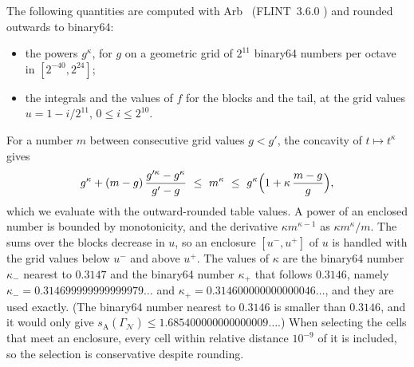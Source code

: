 \documentclass[11pt]{amsart}
\theoremstyle{definition}
\theoremstyle{remark}
\newcommand{\GN}{\Gamma_{\mathcal N}}
\newcommand{\sA}{s_{\mathrm A}}
\begin{document}
The following quantities are computed with Arb~\cite{Arb} (FLINT~3.6.0 \cite{FLINT}) and rounded outwards to binary64:
\begin{itemize}
\item the powers $g^\kappa$, for $g$ on a geometric grid of $2^{11}$ binary64 numbers per octave in $[2^{-40},2^{24}]$;
\item the integrals and the values of $f$ for the blocks and the tail, at the grid values $u=1-i/2^{11}$, $0\le i\le2^{10}$.
\end{itemize}
For a number $m$ between consecutive grid values $g<g'$, the concavity of $t\mapsto t^\kappa$ gives
\[
  g^\kappa+(m-g)\,\frac{g'^\kappa-g^\kappa}{g'-g}\ \le\ m^\kappa\ \le\ g^\kappa\Bigl(1+\kappa\,\frac{m-g}{g}\Bigr),
\]
which we evaluate with the outward-rounded table values. A power of an enclosed number is bounded by monotonicity, and the derivative $\kappa m^{\kappa-1}$ as $\kappa m^\kappa/m$. The sums over the blocks decrease in $u$, so an enclosure $[u^-,u^+]$ of $u$ is handled with the grid values below $u^-$ and above $u^+$. The values of $\kappa$ are the binary64 number $\kappa_-$ nearest to $0.3147$ and the binary64 number $\kappa_+$ that follows $0.3146$, namely $\kappa_-=0.314699999999999979\ldots$ and $\kappa_+=0.314600000000000046\ldots$, and they are used exactly. (The binary64 number nearest to $0.3146$ is smaller than $0.3146$, and it would only give $\sA(\GN)\le1.685400000000000009\ldots$.) When selecting the cells that meet an enclosure, every cell within relative distance $10^{-9}$ of it is included, so the selection is conservative despite rounding.
\end{document}

